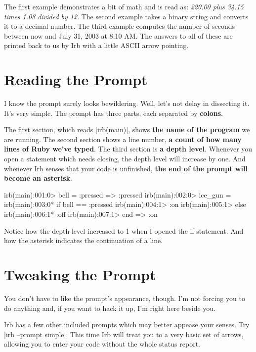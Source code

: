 \documentclass[12pt,twoside]{report}
\begin{document}
The first example demonstrates a bit of math and is read as:
\emph{220.00 plus 34.15 times 1.08 divided by 12}. The second example
takes a binary string and converts it to a decimal number. The third
example computes the number of seconds between now and July 31, 2003
at 8:10 AM. The answers to all of these are printed back to us by Irb
with a little ASCII arrow pointing.

\section{Reading the Prompt}

I know the prompt surely looks bewildering. Well, let's not delay in
dissecting it. It's very simple. The prompt has three parts, each
separated by \textbf{colons}.

The first section, which reads \consoleinline|irb(main)|,
shows \textbf{the name of the program} we are running. The second
section shows a line number, \textbf{a count of how many lines of Ruby
  we've typed}. The third section is \textbf{a depth level}. Whenever
you open a statement which needs closing, the depth level will
increase by one. And whenever Irb senses that your code is unfinished,
\textbf{the end of the prompt will become an asterisk}.

\begin{consolecode}
 irb(main):001:0> bell = :pressed 
 => :pressed 
 irb(main):002:0> ice_gun = 
 irb(main):003:0*   if bell == :pressed 
 irb(main):004:1>     :on
 irb(main):005:1>   else 
 irb(main):006:1*     :off 
 irb(main):007:1>   end
 => :on
\end{consolecode}

Notice how the depth level increased to 1 when I opened the if
statement. And how the asterisk indicates the continuation of a line.

\section{Tweaking the Prompt}

You don't have to like the prompt's appearance, though. I'm not
forcing you to do anything and, if you want to hack it up, I'm right
here beside you.

Irb has a few other included prompts which may better appease your
senses. Try \consoleinline|irb --prompt simple|. This time Irb will treat you to a
very basic set of arrows, allowing you to enter your code without the
whole status report.
\end{document}
